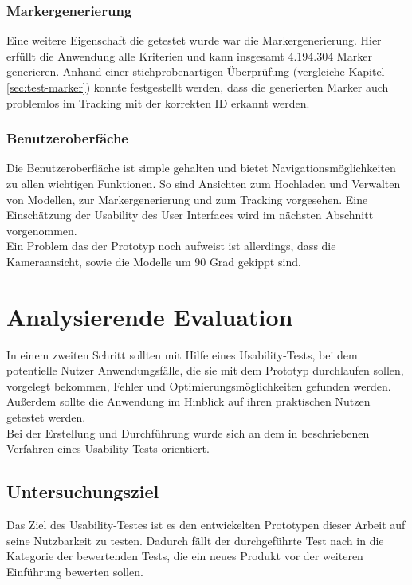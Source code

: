 \subsubsection{Markergenerierung}
Eine weitere Eigenschaft die getestet wurde war die Markergenerierung. Hier erfüllt die Anwendung alle Kriterien und kann insgesamt 4.194.304 Marker generieren. Anhand einer stichprobenartigen Überprüfung (vergleiche Kapitel \ref{sec:test-marker}) konnte festgestellt werden, dass die generierten Marker auch problemlos im Tracking mit der korrekten ID erkannt werden.

\subsubsection{Benutzeroberfäche}
Die Benutzeroberfläche ist simple gehalten und bietet Navigationsmöglichkeiten zu allen wichtigen Funktionen. So sind Ansichten zum Hochladen und Verwalten von Modellen, zur Markergenerierung und zum Tracking vorgesehen. Eine Einschätzung der Usability des User Interfaces wird im nächsten Abschnitt vorgenommen. \\
Ein Problem das der Prototyp noch aufweist ist allerdings, dass die Kameraansicht, sowie die Modelle um 90 Grad gekippt sind.

\section{Analysierende Evaluation}
In einem zweiten Schritt sollten mit Hilfe eines Usability-Tests, bei dem potentielle Nutzer Anwendungsfälle, die sie mit dem Prototyp durchlaufen sollen, vorgelegt bekommen, Fehler und Optimierungsmöglichkeiten gefunden werden. Außerdem sollte die Anwendung im Hinblick auf ihren praktischen Nutzen getestet werden.\\ 
Bei der Erstellung und Durchführung wurde sich an dem in \cite[Kapitel 4]{hegner:evaluation} beschriebenen Verfahren eines Usability-Tests orientiert.

\subsection{Untersuchungsziel}
Das Ziel des Usability-Testes ist es den entwickelten Prototypen dieser Arbeit auf seine Nutzbarkeit zu testen. Dadurch fällt der durchgeführte Test nach \cite[S. 37]{hegner:evaluation} in die Kategorie der bewertenden Tests, die ein neues Produkt vor der weiteren Einführung bewerten sollen.



